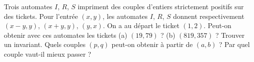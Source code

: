 Trois automates $I$, $R$, $S$ impriment des couples d'entiers strictement positifs sur des tickets. Pour l'entrée $(x, y)$, les automates $I$, $R$, $S$ donnent respectivement $(x - y, y)$, $(x + y, y)$, $(y, x)$. On a au départ le ticket $(1, 2)$. Peut-on obtenir avec ces automates les tickets (a) $(19, 79)$ ? (b) $(819, 357)$ ? Trouver un invariant. Quels couples $(p, q)$ peut-on obtenir à partir de $(a, b)$ ? Par quel couple vaut-il mieux passer ?
